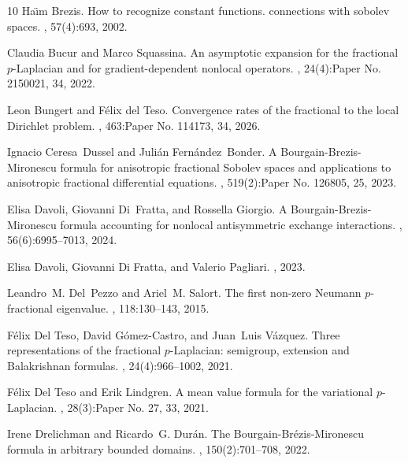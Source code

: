 \documentclass[12pt, reqno]{amsart}%
\theoremstyle{plain}  %
\theoremstyle{definition}  %
\numberwithin{equation}{section}
\begin{document}
{\begin{thebibliography}{10}
Ha\"{\i}m Brezis.
\newblock How to recognize constant functions. connections with sobolev spaces.
, 57(4):693, 2002.

Claudia Bucur and Marco Squassina.
\newblock An asymptotic expansion for the fractional {$p$}-{L}aplacian and for
  gradient-dependent nonlocal operators.
, 24(4):Paper No. 2150021, 34, 2022.

Leon {Bungert} and F{\'e}lix {del Teso}.
\newblock Convergence rates of the fractional to the local {D}irichlet problem.
, 463:Paper No. 114173, 34, 2026.

Ignacio Ceresa~Dussel and Juli\'an Fern\'andez~Bonder.
\newblock A {B}ourgain-{B}rezis-{M}ironescu formula for anisotropic fractional
  {S}obolev spaces and applications to anisotropic fractional differential
  equations.
, 519(2):Paper No. 126805, 25, 2023.

Elisa Davoli, Giovanni Di~Fratta, and Rossella Giorgio.
\newblock A {B}ourgain-{B}rezis-{M}ironescu formula accounting for nonlocal
  antisymmetric exchange interactions.
, 56(6):6995--7013, 2024.

Elisa {Davoli}, Giovanni {Di Fratta}, and Valerio {Pagliari}.
, 2023.

Leandro~M. Del~Pezzo and Ariel~M. Salort.
\newblock The first non-zero {N}eumann {$p$}-fractional eigenvalue.
, 118:130--143, 2015.

F\'{e}lix {Del Teso}, David {G\'{o}mez-Castro}, and Juan~Luis V{\'a}zquez.
\newblock Three representations of the fractional {$p$}-{L}aplacian: semigroup,
  extension and {B}alakrishnan formulas.
, 24(4):966--1002, 2021.

F\'{e}lix {Del Teso} and Erik Lindgren.
\newblock A mean value formula for the variational {$p$}-{L}aplacian.
, 28(3):Paper No.
  27, 33, 2021.

Irene Drelichman and Ricardo~G. Dur\'{a}n.
\newblock The {B}ourgain-{B}r\'{e}zis-{M}ironescu formula in arbitrary bounded
  domains.
, 150(2):701--708, 2022.


\end{thebibliography}}
\end{document}
